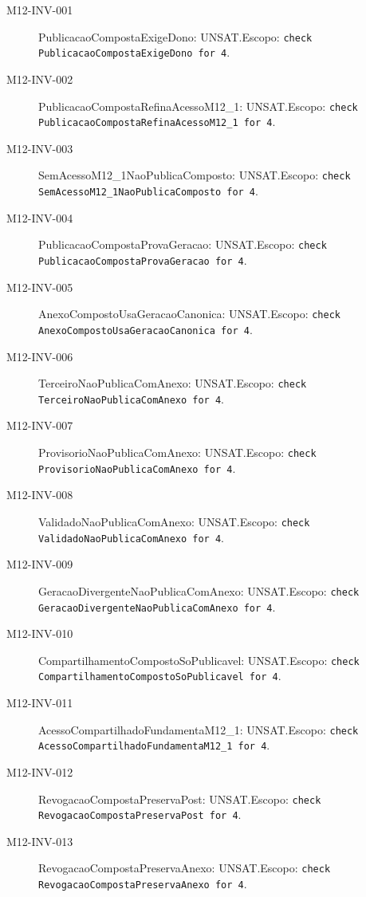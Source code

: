 \begin{description}
\item[M12-INV-001] PublicacaoCompostaExigeDono: UNSAT.\newline Escopo: \texttt{check PublicacaoCompostaExigeDono for 4}.
\item[M12-INV-002] PublicacaoCompostaRefinaAcessoM12\_1: UNSAT.\newline Escopo: \texttt{check PublicacaoCompostaRefinaAcessoM12\_1 for 4}.
\item[M12-INV-003] SemAcessoM12\_1NaoPublicaComposto: UNSAT.\newline Escopo: \texttt{check SemAcessoM12\_1NaoPublicaComposto for 4}.
\item[M12-INV-004] PublicacaoCompostaProvaGeracao: UNSAT.\newline Escopo: \texttt{check PublicacaoCompostaProvaGeracao for 4}.
\item[M12-INV-005] AnexoCompostoUsaGeracaoCanonica: UNSAT.\newline Escopo: \texttt{check AnexoCompostoUsaGeracaoCanonica for 4}.
\item[M12-INV-006] TerceiroNaoPublicaComAnexo: UNSAT.\newline Escopo: \texttt{check TerceiroNaoPublicaComAnexo for 4}.
\item[M12-INV-007] ProvisorioNaoPublicaComAnexo: UNSAT.\newline Escopo: \texttt{check ProvisorioNaoPublicaComAnexo for 4}.
\item[M12-INV-008] ValidadoNaoPublicaComAnexo: UNSAT.\newline Escopo: \texttt{check ValidadoNaoPublicaComAnexo for 4}.
\item[M12-INV-009] GeracaoDivergenteNaoPublicaComAnexo: UNSAT.\newline Escopo: \texttt{check GeracaoDivergenteNaoPublicaComAnexo for 4}.
\item[M12-INV-010] CompartilhamentoCompostoSoPublicavel: UNSAT.\newline Escopo: \texttt{check CompartilhamentoCompostoSoPublicavel for 4}.
\item[M12-INV-011] AcessoCompartilhadoFundamentaM12\_1: UNSAT.\newline Escopo: \texttt{check AcessoCompartilhadoFundamentaM12\_1 for 4}.
\item[M12-INV-012] RevogacaoCompostaPreservaPost: UNSAT.\newline Escopo: \texttt{check RevogacaoCompostaPreservaPost for 4}.
\item[M12-INV-013] RevogacaoCompostaPreservaAnexo: UNSAT.\newline Escopo: \texttt{check RevogacaoCompostaPreservaAnexo for 4}.

\end{description}
